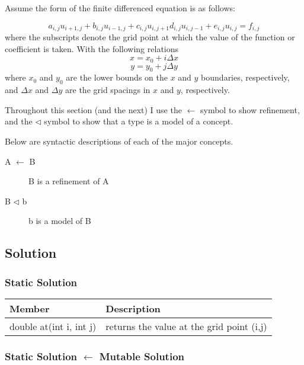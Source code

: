 \documentclass{article}
\begin{document}
Assume the form of the finite differenced equation is as follows:

\begin{equation}
a_{i,j} u_{i+1, j} + b_{i,j} u_{i-1, j} + c_{i,j} u_{i, j+1} d_{i,j} u_{i, j-1} + e_{i,j} u_{i, j} = 
f_{i,j}
\end{equation}
where the subscripts denote the grid point at which the value of the function or coefficient is taken.
With the following relations
\begin{equation}
x = x_{0} + i \Delta x
\end{equation}
\begin{equation}
y = y_{0} + j \Delta y
\end{equation}
where $x_0$ and $y_0$ are the lower bounds on the $x$ and $y$ boundaries, respectively, and $\Delta x$ and
$\Delta y$ are the grid spacings in $x$ and $y$, respectively.

Throughout this section (and the next) I use the $\leftarrow$ symbol to show refinement,
and the $\triangleleft$ symbol to show that a type is a model of a concept.

Below are syntactic descriptions of each of the major concepts.

\begin{description}
\item[A $\leftarrow$ B] B is a refinement of A
\item[B $\triangleleft$ b] b is a model of B
\end{description}

\subsection{Solution}
\subsubsection{Static Solution}

\begin{tabular}[!htb]{|p{5.25 cm}|p{8 cm}|}
\hline
Member&	Description\\
\hline
double at(int i, int j)&	returns the value at the grid point (i,j)\\
\hline
\end{tabular}

\subsubsection{Static Solution $\leftarrow$ Mutable Solution}
\end{document}
